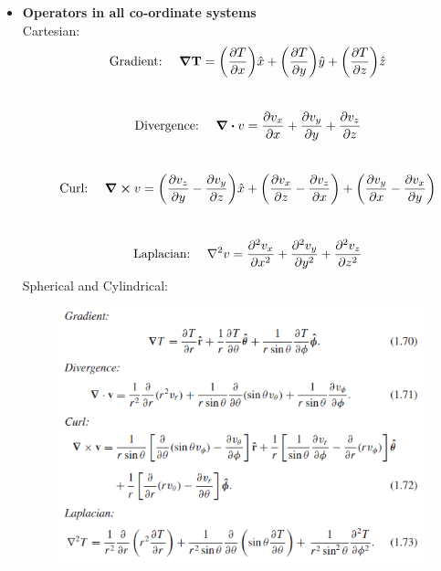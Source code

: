 \documentclass[12pt, oneside]{book}
\begin{document}
\begin{itemize}
\begin{enumerate}
   \end{enumerate}
\item \textbf{Operators in all co-ordinate systems}\\
Cartesian:\\
\begin{equation}
	\qq{Gradient:}\ \grad{\textbf{T}}=\bigg(\pdv{T}{x}\bigg)\hat{x}+\bigg(\pdv{T}{y}\bigg)\hat{y}+\bigg(\pdv{T}{z}\bigg)\hat{z}
\end{equation}\\
\begin{equation}
	\qq{Divergence:}\ \div{v}=\pdv{v_x}{x}+\pdv{v_y}{y}+\pdv{v_z}{z}
\end{equation}\\
\begin{equation}
	\qq{Curl:}\ \curl{v}=\bigg(\pdv{v_z}{y}-\pdv{v_y}{z}\bigg)\hat{x}+\bigg(\pdv{v_x}{z}-\pdv{v_z}{x}\bigg)+\bigg(\pdv{v_y}{x}-\pdv{v_x}{y}\bigg)
\end{equation}\\
\begin{equation}
	\qq{Laplacian:}\ \laplacian{v}=\pdv[2]{v_x}{x}+\pdv[2]{v_y}{y}+\pdv[2]{v_z}{z}
\end{equation}
Spherical and Cylindrical: \\
\begin{figure}[h]
	\centering
	\includegraphics{operators_spherical.png}
\end{figure}\\
\begin{figure}[h]
	\centering

\end{figure}
\end{itemize}
\end{document}
